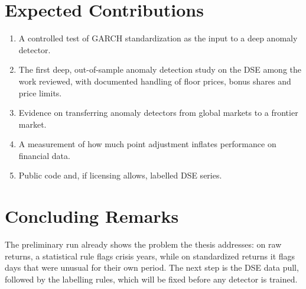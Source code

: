 \section{Expected Contributions}
\begin{enumerate}
    \item A controlled test of GARCH standardization as the input to a deep anomaly
    detector.
    \item The first deep, out-of-sample anomaly detection study on the DSE among the work
    reviewed, with documented handling of floor prices, bonus shares and price limits.
    \item Evidence on transferring anomaly detectors from global markets to a frontier
    market.
    \item A measurement of how much point adjustment inflates performance on financial data.
    \item Public code and, if licensing allows, labelled DSE series.
\end{enumerate}

\section{Concluding Remarks}
The preliminary run already shows the problem the thesis addresses: on raw returns, a
statistical rule flags crisis years, while on standardized returns it flags days that were
unusual for their own period. The next step is the DSE data pull, followed by the labelling
rules, which will be fixed before any detector is trained.
